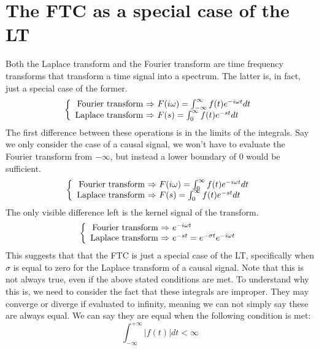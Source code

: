 \documentclass[]{subfiles}
\begin{document}
	\section{The FTC as a special case of the LT}
	Both  the  Laplace  transform  and  the  Fourier  transform  are  time  frequency  transforms that transform a time signal into a spectrum. The latter is, in fact, just a special case of the former. 
		\begin{equation*}
		\left\{ \begin{array}{r@{\text{ $\Rightarrow$ }}l}
			\text{Fourier transform}& F(i\omega)= \int_{-\infty}^{\infty}f(t)e^{-i\omega t}dt \\
			\text{Laplace transform}&F(s)=\int_{0}^{\infty}f(t)e^{-st} dt
		\end{array}\right.
	\end{equation*}
	The first difference between these operations is in the limits of the integrals. Say we only consider the case of a causal signal, we won't have to evaluate the Fourier transform from $-\infty$, but instead a lower boundary  of $0$ would be sufficient. 
			\begin{equation*}
		\left\{ \begin{array}{r@{\text{ $\Rightarrow$ }}l}
			\text{Fourier transform}& F(i\omega)= \int_{0}^{\infty}f(t)e^{-i\omega t}dt \\
			\text{Laplace transform}&F(s)=\int_{0}^{\infty}f(t)e^{-st} dt
		\end{array}\right.
	\end{equation*}
	The only visible difference left is the kernel signal of the transform. 
				\begin{equation*}
		\left\{ \begin{array}{r@{\text{ $\Rightarrow$ }}l}
			\text{Fourier transform}& e^{-i\omega t} \\
			\text{Laplace transform}&e^{-st} = e^{-\sigma t} e^{-i\omega t}
		\end{array}\right.
	\end{equation*}
	This suggests that that the FTC is just a special case of the LT, specifically when $\sigma$ is equal to zero for the Laplace transform of a causal signal. Note that this is not always true, even if the above stated conditions are met. To understand why this is, we need to consider the fact that these integrals are improper. They may converge or diverge if evaluated to infinity, meaning we can not simply say these are always equal. 
We can say they are equal when the following condition is met:
		\begin{equation*}
			\int_{-\infty}^{+\infty}|f(t)|dt<\infty
		\end{equation*}
\end{document}
